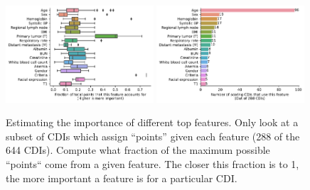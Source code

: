 \documentclass[10pt]{article}
\begin{document}
\begin{figure}[H]
    \centering
    \includegraphics[width=0.49\textwidth]{../results/scoring_cdi_boxplot.pdf}
    \includegraphics[width=0.49\textwidth]{../results/scoring_cdi_counts.pdf}
    \caption{Estimating the importance of different top features.
    Only look at a subset of CDIs which assign ``points'' given each feature (288 of the 644 CDIs).
    Compute what fraction of the maximum possible ``points`` come from a given feature.
    The closer this fraction is to 1, the more important a feature is for a particular CDI.
    }
\end{figure}
\end{document}
